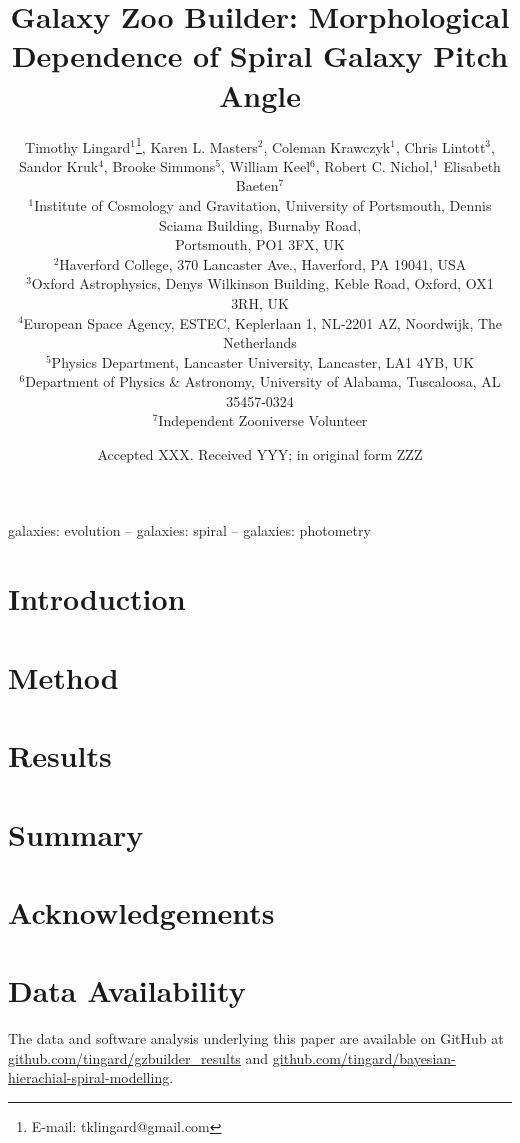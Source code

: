 \documentclass[fleqn,usenatbib]{mnras}
\title[Galaxy Zoo Builder: Morphological Dependence of Spiral galaxy Pitch Angle]{Galaxy Zoo Builder: Morphological Dependence of Spiral Galaxy Pitch Angle}
\author[T. Lingard et al.]{
  Timothy Lingard$^{1}$\thanks{E-mail: tklingard@gmail.com}, %
  Karen L. Masters$^{2}$, %
  Coleman Krawczyk$^{1}$, %
  Chris Lintott$^{3}$, %
  \newauthor
  Sandor Kruk$^{4}$, %
  Brooke Simmons$^{5}$, %
  William Keel$^{6}$, %
  Robert C. Nichol,$^{1}$ %
  \newauthor
  Elisabeth Baeten$^{7}$
  \\
  $^{1}$Institute of Cosmology and Gravitation, University of Portsmouth, Dennis Sciama Building, Burnaby Road,\\
  Portsmouth, PO1 3FX, UK\\
  $^{2}$Haverford College, 370 Lancaster Ave., Haverford, PA 19041, USA\\
  $^{3}$Oxford Astrophysics, Denys Wilkinson Building, Keble Road, Oxford, OX1 3RH, UK\\
  $^{4}$European Space Agency, ESTEC, Keplerlaan 1, NL-2201 AZ, Noordwijk, The Netherlands\\
  $^{5}$Physics Department, Lancaster University, Lancaster, LA1 4YB, UK\\
  $^{6}$Department of Physics \& Astronomy, University of Alabama, Tuscaloosa, AL 35457-0324\\
  $^{7}$Independent Zooniverse Volunteer\\
}
\date{Accepted XXX. Received YYY; in original form ZZZ}
\begin{document}
\label{firstpage}
\pagerange{\pageref{firstpage}--\pageref{lastpage}}
\maketitle

\begin{abstract}

\end{abstract}

\begin{keywords}
galaxies: evolution -- galaxies: spiral -- galaxies: photometry
\end{keywords}



% 

\section{Introduction}


\section{Method}


\section{Results}


\section{Summary}


\section{Acknowledgements}


\section{Data Availability}
The data and software analysis underlying this paper are available on GitHub at \url{github.com/tingard/gzbuilder_results} and \url{github.com/tingard/bayesian-hierachial-spiral-modelling}.
\end{document}
